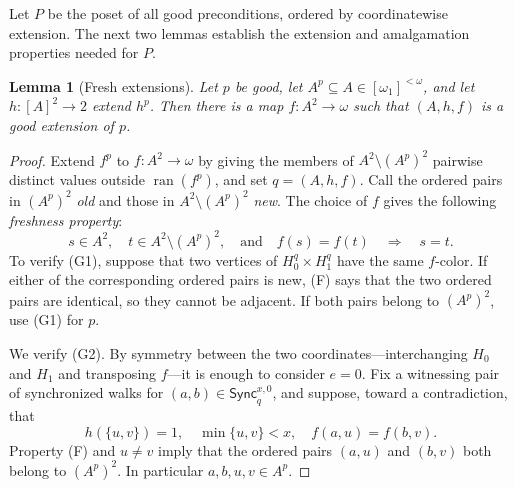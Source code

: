 \documentclass[10pt,a4paper]{amsart}
\numberwithin{equation}{section}
\newtheorem{lemma}[theorem]{Lemma}
\theoremstyle{definition}
\theoremstyle{remark}
\begin{document}
Let $P$ be the poset of all good preconditions, ordered by coordinatewise
extension.  The next two lemmas establish the extension and amalgamation
properties needed for $P$.

\begin{lemma}[Fresh extensions]\label{lem:fresh}
Let $p$ be good, let $A^p\subseteq A\in[\omega_1]^{<\omega}$, and
let $h:[A]^2\to2$ extend $h^p$.  Then there is a map
$f:A^2\to\omega$ such that $(A,h,f)$ is a good extension of $p$.
\end{lemma}

\begin{proof}
Extend $f^p$ to $f:A^2\to\omega$ by giving the members of
$A^2\setminus(A^p)^2$ pairwise distinct values outside
$\operatorname{ran}(f^p)$, and set $q=(A,h,f)$.  Call the ordered
pairs in $(A^p)^2$ \emph{old} and those in
$A^2\setminus(A^p)^2$ \emph{new}.  The choice of $f$ gives the
following \emph{freshness property}:
\begin{displaymath}
 s\in A^2,\quad t\in A^2\setminus(A^p)^2,
 \quad\text{and}\quad f(s)=f(t)
 \quad\Longrightarrow\quad s=t.                       \tag{F}
\end{displaymath}
To verify (G1), suppose that two
vertices of $H_0^q\times H_1^q$ have the same $f$-color.  If either of
the corresponding ordered pairs is new, (F) says
that the two ordered pairs are identical, so they cannot be adjacent.
If both pairs belong to $(A^p)^2$, use (G1) for $p$.

We verify (G2).  By symmetry between the two coordinates---interchanging
$H_0$ and $H_1$ and transposing $f$---it is enough to consider $e=0$.
Fix a witnessing pair of synchronized walks for
$(a,b)\in\mathsf{Sync}^{x,0}_q$, and suppose, toward a contradiction,
that
\begin{equation}\label{eq:fresh-g2-counterexample}
 h(\{u,v\})=1,\quad \min\{u,v\}<x,\quad
 f(a,u)=f(b,v).
\end{equation}
Property (F) and $u\ne v$ imply that the ordered pairs $(a,u)$ and
$(b,v)$ both belong to $(A^p)^2$.  In particular
$a,b,u,v\in A^p$.


\end{proof}
\end{document}
